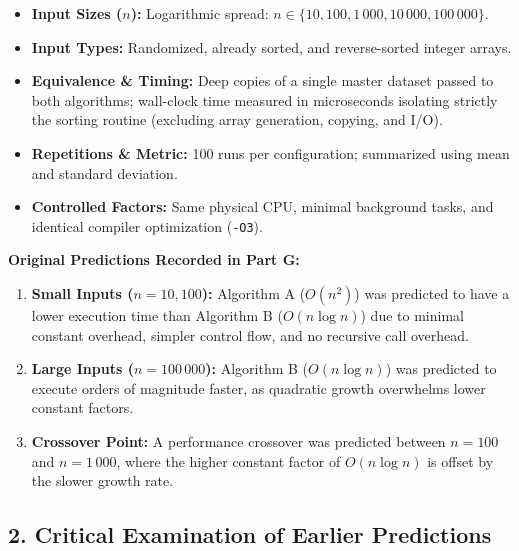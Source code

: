 \documentclass[11pt]{article}
\begin{document}
\begin{itemize}
    \item \textbf{Input Sizes ($n$):} Logarithmic spread: $n \in \{10, 100, 1\,000, 10\,000, 100\,000\}$.
    \item \textbf{Input Types:} Randomized, already sorted, and reverse-sorted integer arrays.
    \item \textbf{Equivalence \& Timing:} Deep copies of a single master dataset passed to both algorithms; wall-clock time measured in microseconds isolating strictly the sorting routine (excluding array generation, copying, and I/O).
    \item \textbf{Repetitions \& Metric:} 100 runs per configuration; summarized using mean and standard deviation.
    \item \textbf{Controlled Factors:} Same physical CPU, minimal background tasks, and identical compiler optimization (\texttt{-O3}).
\end{itemize}

\noindent\textbf{Original Predictions Recorded in Part G:}
\begin{enumerate}
    \item \textbf{Small Inputs ($n = 10, 100$):} Algorithm A ($O(n^2)$) was predicted to have a lower execution time than Algorithm B ($O(n \log n)$) due to minimal constant overhead, simpler control flow, and no recursive call overhead.
    \item \textbf{Large Inputs ($n = 100\,000$):} Algorithm B ($O(n \log n)$) was predicted to execute orders of magnitude faster, as quadratic growth overwhelms lower constant factors.
    \item \textbf{Crossover Point:} A performance crossover was predicted between $n = 100$ and $n = 1\,000$, where the higher constant factor of $O(n \log n)$ is offset by the slower growth rate.
\end{enumerate}

\subsection*{2. Critical Examination of Earlier Predictions}
\end{document}
